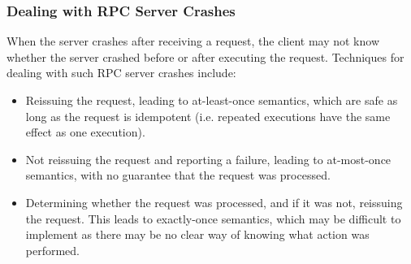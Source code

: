 \documentclass[12pt,titlepage]{article}
\begin{document}
      \subsubsection{Dealing with RPC Server Crashes}
        When the server crashes after receiving a request, the client may not know whether the server crashed
        before or after executing the request. Techniques for dealing with such RPC server crashes include:
        \begin{itemize}
          \item Reissuing the request, leading to at-least-once semantics, which are safe as long as the request is idempotent
            (i.e. repeated executions have the same effect as one execution).
          \item Not reissuing the request and reporting a failure, leading to at-most-once semantics, with no guarantee that the
            request was processed.
          \item Determining whether the request was processed, and if it was not, reissuing the request. This leads to exactly-once
            semantics, which may be difficult to implement as there may be no clear way of knowing what action was performed.
        \end{itemize}
\end{document}

